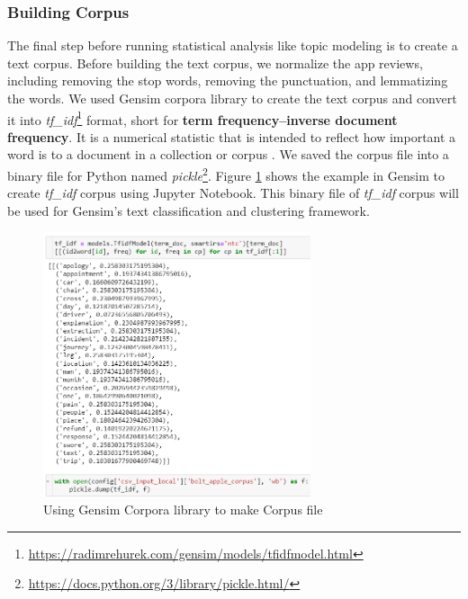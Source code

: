 \documentclass[12pt]{article}
\begin{document}
\subsubsection{Building Corpus}
The final step before running statistical analysis like topic modeling \cite{text_corpus} is to create a text corpus. Before building the text corpus, we normalize the app reviews, including removing the stop words, removing the punctuation, and lemmatizing the words. We used Gensim corpora library \cite{gensim} to create the text corpus and convert it into \textit{tf\_idf}\footnote{\url{https://radimrehurek.com/gensim/models/tfidfmodel.html}} format, short for \textbf{term frequency–inverse document frequency}. It is a numerical statistic that is intended to reflect how important a word is to a document in a collection or corpus \cite{rajaraman_ullman_2011}. We saved the corpus file into a binary file for Python named \textit{pickle}\footnote{\url{https://docs.python.org/3/library/pickle.html/}}. Figure \ref{fig:img_corpus} shows the example in Gensim to create \textit{tf\_idf} corpus using Jupyter Notebook. This binary file of \textit{tf\_idf} corpus will be used for Gensim's text classification and clustering framework.


\begin{figure}[!h]
\begin{center}
\includegraphics[width=0.7\textwidth]{figures/image19.png}
\caption{Using Gensim Corpora library to make Corpus file}
\label{fig:img_corpus}
\end{center}
\end{figure}

\newpage
\end{document}
